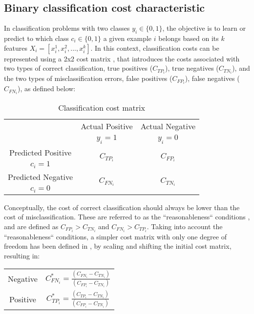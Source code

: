 \subsection{Binary classification cost characteristic}
    In classification problems with two classes $y_i \in \{0,1\}$, the objective is to learn or 
    predict to which class $c_i \in \{0,1\}$ a given example $i$ belongs based on its $k$ features 
    $X_i=[x^1_i, x^2_i,...,x^k_i]$. In this context, classification costs can be represented using 
    a 2x2 cost matrix \citep{Elkan2001}, that introduces the costs associated with two types of 
    correct classification, true positives ($C_{TP_i}$), true negatives ($C_{TN_i}$), and the two 
    types of misclassification errors, false positives ($C_{FP_i}$), false negatives ($C_{FN_i}$),
    as defined below:
    \begin{table}[h]
      \caption{Classification cost matrix}
      \centering
      \begin{tabular}{c|c|c}
        \multicolumn{1}{c|}{}  & Actual Positive& Actual Negative \\
        \multicolumn{1}{c|}{} & $y_i=1$& $y_i=0$ \\
        \hline
        Predicted Positive    & \multirow{ 2}{*}{$C_{TP_i}$} & \multirow{ 2}{*}{$C_{FP_i}$} \\
        $c_i=1$ & &\\
        \hline
        Predicted Negative    & \multirow{ 2}{*}{$C_{FN_i}$} & \multirow{ 2}{*}{$C_{TN_i}$} \\
        $c_i=0$ & &\\
      \end{tabular}
    \end{table}  

  Conceptually, the cost of correct classification should always be lower than the cost of 
misclassification.
  These are referred to as the ``reasonableness`` conditions \citep{Elkan2001}, and are defined as
  $C_{FP_i} > C_{TN_i}$ and $C_{FN_i} > C_{TP_i}$.
  Taking into account the ``reasonableness`` conditions, a simpler cost matrix 
  with only one degree of freedom has been defined in \citep{Elkan2001},
  by scaling and shifting the initial cost matrix, resulting in:
  \begin{center}
  \begin{tabular}{c|c}

  \multirow{ 2}{*}{Negative} & \multirow{ 
2}{*}{$C^*_{FN_i}=\frac{(C_{FN_i}-C_{TN_i})}{(C_{FP_i}-C_{TN_i})}$} \\
  \\
  \hline
  \multirow{ 2}{*}{Positive} & \multirow{ 
2}{*}{$C^*_{TP_i}=\frac{(C_{TP_i}-C_{TN_i})}{(C_{FP_i}-C_{TN_i})}$} \\
  \\ 
  \end{tabular}
\end{center}

